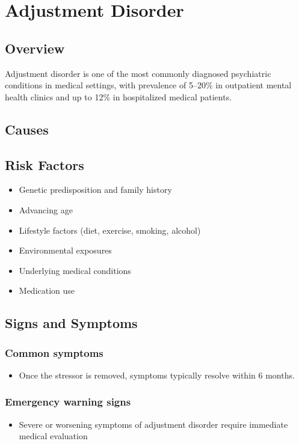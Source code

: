 \chapter{Adjustment Disorder}
\label{sec:Adjustment Disorder}

\section{Overview}
Adjustment disorder is one of the most commonly diagnosed psychiatric conditions in medical settings, with prevalence of 5--20\% in outpatient mental health clinics and up to 12\% in hospitalized medical patients.
\section{Causes}
\section{Risk Factors}

\begin{itemize}[noitemsep]
  \item Genetic predisposition and family history
  \item Advancing age
  \item Lifestyle factors (diet, exercise, smoking, alcohol)
  \item Environmental exposures
  \item Underlying medical conditions
  \item Medication use
\end{itemize}
\section{Signs and Symptoms}

\subsection{Common symptoms}
\begin{itemize}[noitemsep]
  \item Once the stressor is removed, symptoms typically resolve within 6 months. 
  \end{itemize}

\subsection{Emergency warning signs}
\begin{itemize}[noitemsep]
  \item Severe or worsening symptoms of adjustment disorder require immediate medical evaluation
\end{itemize}
